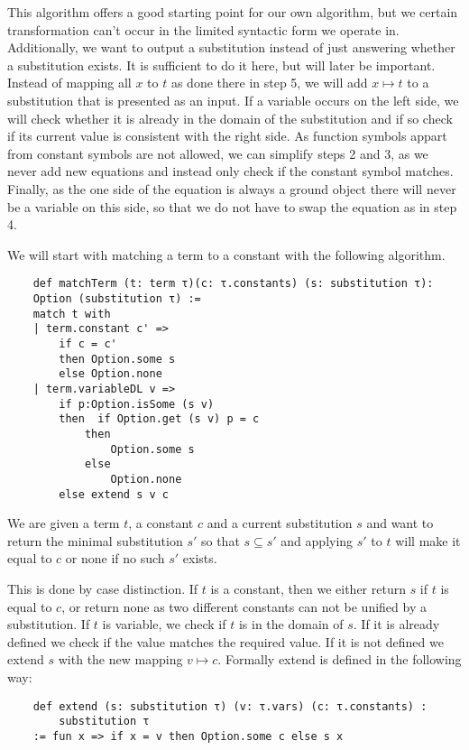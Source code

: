 This algorithm offers a good starting point for our own algorithm, but we certain transformation can't occur in the limited syntactic form we operate in. Additionally, we want to output a substitution instead of just answering whether a substitution exists. It is sufficient to do it here, but will later be important. Instead of mapping all $x$ to $t$ as done there in step 5, we will add $x\mapsto t$ to a substitution that is presented as an input. If a variable occurs on the left side, we will check whether it is already in the domain of the substitution and if so check if its current value is consistent with the right side.
As function symbols appart from constant symbols are not allowed, we can simplify steps 2 and 3, as we never add new equations and instead only check if the constant symbol matches. Finally, as the one side of the equation is always a ground object there will never be a variable on this side, so that we do not have to swap the equation as in step 4.

We will start with matching a term to a constant with the following algorithm.

\begin{lstlisting}
    def matchTerm (t: term τ)(c: τ.constants) (s: substitution τ):
    Option (substitution τ) :=
    match t with
    | term.constant c' =>
        if c = c'
        then Option.some s
        else Option.none
    | term.variableDL v =>
        if p:Option.isSome (s v)
        then  if Option.get (s v) p = c
            then
                Option.some s
            else
                Option.none
        else extend s v c
\end{lstlisting}

We are given a term $t$, a constant $c$ and a current substitution $s$ and want to return the minimal substitution $s'$ so that $s \subseteq s'$ and applying $s'$ to $t$ will make it equal to $c$ or none if no such $s'$ exists.

This is done by case distinction. If $t$ is a constant, then we either return $s$ if $t$ is equal to $c$, or return none as two different constants can not be unified by a substitution. If $t$ is variable, we check if $t$ is in the domain of $s$. If it is already defined we check if the value matches the required value. If it is not defined we extend $s$ with the new mapping $v \mapsto c$.
Formally extend is defined in the following way:

\begin{lstlisting}
    def extend (s: substitution τ) (v: τ.vars) (c: τ.constants) :
        substitution τ 
    := fun x => if x = v then Option.some c else s x
\end{lstlisting}

